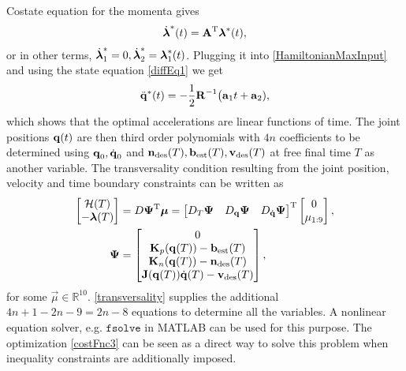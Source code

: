 %
Costate equation for the momenta gives
%
\begin{align}
\dot{\boldsymbol{\mathrm{\lambda}}}^{*}(t) = \boldsymbol{\mathrm{A}}^{\mathrm{T}}\boldsymbol{\mathrm{\lambda}}^{*}(t),
\end{align}
%
\noindent or in other terms, $\dot{\boldsymbol{\mathrm{\lambda}}}^{*}_1 = 0, \dot{\boldsymbol{\mathrm{\lambda}}}^{*}_2 = \boldsymbol{\mathrm{\lambda}}_1^{*}(t)$. Plugging it into \eqref{HamiltonianMaxInput} and using the state equation \eqref{diffEq1} we get
%
\begin{align}
\ddot{\boldsymbol{\mathrm{q}}}^{*}(t) = -\frac{1}{2}\boldsymbol{\mathrm{R}}^{-1}\big(\boldsymbol{\mathrm{a}}_1t + \boldsymbol{\mathrm{a}}_2),
\end{align}
%
\noindent which shows that the optimal accelerations are linear functions of time. The joint positions $\boldsymbol{\mathrm{q}}(t)$ are then third order polynomials with $4n$ coefficients to be determined using $\boldsymbol{\mathrm{q}}_0, \dot{\boldsymbol{\mathrm{q}}}_0$ and $\boldsymbol{\mathrm{n}}_{\mathrm{des}}(T), \boldsymbol{\mathrm{b}}_{\mathrm{est}}(T), \boldsymbol{\mathrm{v}}_{\mathrm{des}}(T)$ at free final time $T$ as another variable. The transversality condition resulting from the joint position, velocity and time boundary constraints can be written as
%
\begin{align}
\begin{bmatrix}
\mathcal{H}(T) \\
-\boldsymbol{\mathrm{\lambda}}(T)
\end{bmatrix} &= D\boldsymbol{\mathrm{\Psi}}^{\mathrm{T}}\boldsymbol{\mathrm{\mu}} = \begin{bmatrix}
D_{T}\boldsymbol{\mathrm{\Psi}} & D_{\boldsymbol{\mathrm{q}}}\boldsymbol{\mathrm{\Psi}} & D_{\dot{\boldsymbol{\mathrm{q}}}}\boldsymbol{\mathrm{\Psi}}
\end{bmatrix}^{\mathrm{T}}\begin{bmatrix}
0 \\ \mu_{1:9}
\end{bmatrix}, \\
\boldsymbol{\mathrm{\Psi}} &= \begin{bmatrix}
0 \\ \boldsymbol{\mathrm{K}}_{p}(\boldsymbol{\mathrm{q}}(T)) - \boldsymbol{\mathrm{b}}_{\mathrm{est}}(T) \\ \boldsymbol{\mathrm{K}}_n(\boldsymbol{\mathrm{q}}(T)) - \boldsymbol{\mathrm{n}}_{\mathrm{des}}(T) \\ \boldsymbol{\mathrm{J}}(\boldsymbol{\mathrm{q}}(T))\dot{\boldsymbol{\mathrm{q}}}(T) - \boldsymbol{\mathrm{v}}_{\mathrm{des}}(T)
\end{bmatrix},
\label{transversality}
\end{align}
%
\noindent for some $\vec{\mu} \in \mathbb{R}^{10}$. \eqref{transversality} supplies the additional $4n + 1 - 2n - 9 = 2n - 8$ equations to determine all the variables. A nonlinear equation solver, e.g. $\mathtt{fsolve}$ in MATLAB can be used for this purpose. The optimization \eqref{costFnc3} can be seen as a direct way to solve this problem when inequality constraints are additionally imposed. 

